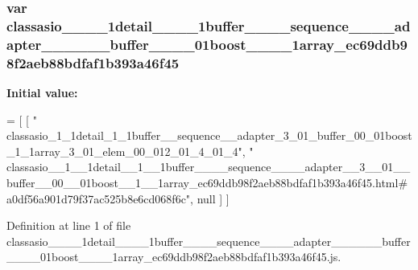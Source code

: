 \subsubsection[{classasio\+\_\+\+\_\+1\+\_\+\+\_\+1detail\+\_\+\+\_\+1\+\_\+\+\_\+1buffer\+\_\+\+\_\+\+\_\+\+\_\+sequence\+\_\+\+\_\+\+\_\+\+\_\+adapter\+\_\+\+\_\+3\+\_\+\+\_\+01\+\_\+\+\_\+buffer\+\_\+\+\_\+00\+\_\+\+\_\+01boost\+\_\+\+\_\+1\+\_\+\+\_\+1array\+\_\+ec69ddb98f2aeb88bdfaf1b393a46f45}]{\setlength{\rightskip}{0pt plus 5cm}var classasio\+\_\+\+\_\+\_\+\+\_\+1detail\+\_\+\+\_\+\_\+\+\_\+1buffer\+\_\+\+\_\+\+\_\+\+\_\+sequence\+\_\+\+\_\+\+\_\+\+\_\+adapter\+\_\+\+\_\+\_\+\+\_\+\_\+\+\_\+buffer\+\_\+\+\_\+\_\+\+\_\+01boost\+\_\+\+\_\+\_\+\+\_\+1array\+\_\+ec69ddb98f2aeb88bdfaf1b393a46f45}\label{classasio____1____1detail____1____1buffer________sequence________adapter____3____01____buffer___d9c20170cf487fbe57729642c3061d68_ab5855377f0d86122e956fbc5c5e49fac}
{\bfseries Initial value\+:}
\begin{DoxyCode}
=
[
    [ \textcolor{stringliteral}{"
      classasio\_1\_1detail\_1\_1buffer\_\_sequence\_\_adapter\_3\_01\_buffer\_00\_01boost\_1\_1array\_3\_01\_elem\_00\_012\_01\_4\_01\_4"}, \textcolor{stringliteral}{"
      classasio\_\_1\_\_1detail\_\_1\_\_1buffer\_\_\_\_sequence\_\_\_\_adapter\_\_3\_\_01\_\_buffer\_\_00\_\_01boost\_\_1\_\_1array\_ec69ddb98f2aeb88bdfaf1b393a46f45.html#a0df56a901d79f37ac525b8e6cd068f6c"}, null ]
]
\end{DoxyCode}


Definition at line 1 of file classasio\+\_\+\+\_\+\_\+\+\_\+1detail\+\_\+\+\_\+\_\+\+\_\+1buffer\+\_\+\+\_\+\+\_\+\+\_\+sequence\+\_\+\+\_\+\+\_\+\+\_\+adapter\+\_\+\+\_\+\_\+\+\_\+\_\+\+\_\+buffer\+\_\+\+\_\+\_\+\+\_\+01boost\+\_\+\+\_\+\_\+\+\_\+1array\+\_\+ec69ddb98f2aeb88bdfaf1b393a46f45.\+js.

